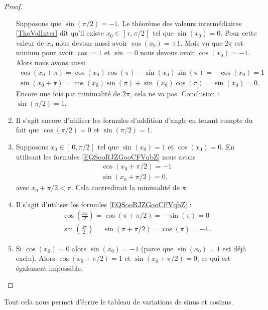 \begin{proof}
\begin{enumerate}
        Supposons que \( \sin(\pi/2)=-1\). Le théorème des valeurs intermédiaires \ref{ThoValInter} dit qu'il existe \( x_0\in\mathopen] \epsilon , \pi/2 \mathclose[\) tel que \( \sin(x_0)=0\). Pour cette valeur de \( x_0\) nous devons aussi avoir \( \cos(x_0)=\pm 1\). Mais vu que \( 2\pi\) est minium pour avoir \( \cos=1\) et \( \sin=0\) nous devons avoir \( \cos(x_0)=-1\). Alors nous avons aussi
            \begin{subequations}
                \begin{align}
                    \cos(x_0+\pi)=\cos(x_0)\cos(\pi)-\sin(x_0)\sin(\pi)=-\cos(x_0)=1\\
                    \sin(x_0+\pi)=\cos(x_0)\sin(\pi)+\sin(x_0)\cos(\pi)=\sin(x_0)=0.
                \end{align}
            \end{subequations}
            Encore une fois par minimalité de \( 2\pi\), cela ne va pas. Conclusion : \( \sin(\pi/2)=1\).
        \item
            Il s'agit encore d'utiliser les formules d'addition d'angle en tenant compte du fait que \( \cos(\pi/2)=0\) et \( \sin(\pi/2)=1\).
        \item
        Supposons \( x_0\in\mathopen] 0 , \pi/2 \mathclose[\) tel que \( \sin(x_0)=1\) et \( \cos(x_0)=0\). En utilisant les formules \eqref{EQSooRJZGooCFVqbZ} nous avons
            \begin{subequations}
                \begin{align}
                    \cos(x_0+\pi/2)=-1\\
                    \sin(x_0+\pi/2)=0,
                \end{align}
            \end{subequations}
            avec \( x_0+\pi/2<\pi\). Cela contredirait la minimalité de \( \pi\).
        \item
            Il s'agit d'utiliser les formules \eqref{EQSooRJZGooCFVqbZ} :
            \begin{subequations}
                \begin{align}
                    \cos(\frac{ 3\pi }{ 2 })=\cos(\pi+\pi/2)=-\sin(\pi)=0\\
                    \sin(\frac{ 3\pi }{ 2 })=\sin(\pi+\pi/2)=\cos(\pi)=-1.
                \end{align}
            \end{subequations}
        \item
            Si \( \cos(x_0)=0\) alors \( \sin(x_0)=-1\) (parce que \( \sin(x_0)=1\) est déjà exclu). Alors \( \cos(x_0+\pi/2)=1\) et \( \sin(x_0+\pi/2)=0\), ce qui est également impossible.
    \end{enumerate}
\end{proof}
Tout cela nous permet d'écrire le tableau de variations de sinus et cosinus.

